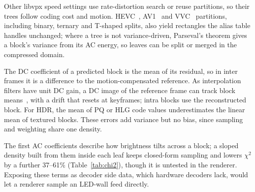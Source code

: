 \documentclass[sigconf]{acmart}
\begin{document}
Other libvpx speed settings use rate-distortion search or reuse partitions, so their trees follow
coding cost and motion. HEVC~\cite{sullivan2012hevc}, AV1~\cite{han2021av1} and VVC~\cite{bross2021vvc} partitions, including binary,
ternary and T-shaped splits, also yield rectangles the alias table handles unchanged; where a
tree is not variance-driven, Parseval's theorem gives a block's variance from its AC energy, so
leaves can be split or merged in the compressed domain.

The DC coefficient of a predicted block is the mean of its residual, so in inter frames it is a
difference to the motion-compensated reference. As interpolation filters have unit DC gain, a DC
image of the reference frame can track block means~\cite{yeo1995rapid}, with a drift that resets
at keyframes; intra blocks use the reconstructed block. For HDR, the mean of PQ or HLG code values
underestimates the linear mean of textured blocks. These errors add variance but no bias, since
sampling and weighting share one density.

The first AC coefficients describe how brightness tilts across a block; a sloped density built
from them inside each leaf keeps closed-form sampling and lowers $\chi^2$ by a further 37--61\%
(Table~\ref{tab:chi2}), though it is untested in the renderer. Exposing these terms as decoder
side data, which hardware decoders lack, would let a renderer sample an LED-wall feed directly.



\end{document}
